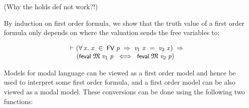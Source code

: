 \documentclass[letterpaper]{article}
\renewcommand{\HOLConst}[1]{{\textsf{\upshape\small #1}}}
\newenvironment{holmath}{\begin{displaymath}\begin{array}{l}}{\end{array}\end{displaymath}\ignorespacesafterend}
\begin{document}
 (Why the holds def not work?!)

By induction on first order formula, we show that the truth value of a first order formula only depends on where the valuation sends the free variables to:

\begin{holmath}
  \ensuremath{\HOLTokenTurnstile}(\HOLSymConst{\HOLTokenForall{}}\HOLBoundVar{x}.\;\HOLBoundVar{x}\;\HOLSymConst{\HOLTokenIn{}}\;\HOLConst{FV}\;\HOLFreeVar{p}\;\HOLSymConst{\HOLTokenImp{}}\;\HOLFreeVar{v\sb{\mathrm{1}}}\;\HOLBoundVar{x}\;\HOLSymConst{=}\;\HOLFreeVar{v\sb{\mathrm{2}}}\;\HOLBoundVar{x})\;\HOLSymConst{\HOLTokenImp{}}\\
\;\;\;\;\;(\HOLConst{feval}\;\HOLFreeVar{\ensuremath{\mathfrak{M}}}\;\HOLFreeVar{v\sb{\mathrm{1}}}\;\HOLFreeVar{p}\;\HOLSymConst{\HOLTokenEquiv{}}\;\HOLConst{feval}\;\HOLFreeVar{\ensuremath{\mathfrak{M}}}\;\HOLFreeVar{v\sb{\mathrm{2}}}\;\HOLFreeVar{p})
\end{holmath}


Models for modal language can be viewed as a first order model and hence be used to interpret some first order formula, and a first order model can be also viewed as a modal model. These conversions can be done using the following two functions:
\end{document}
